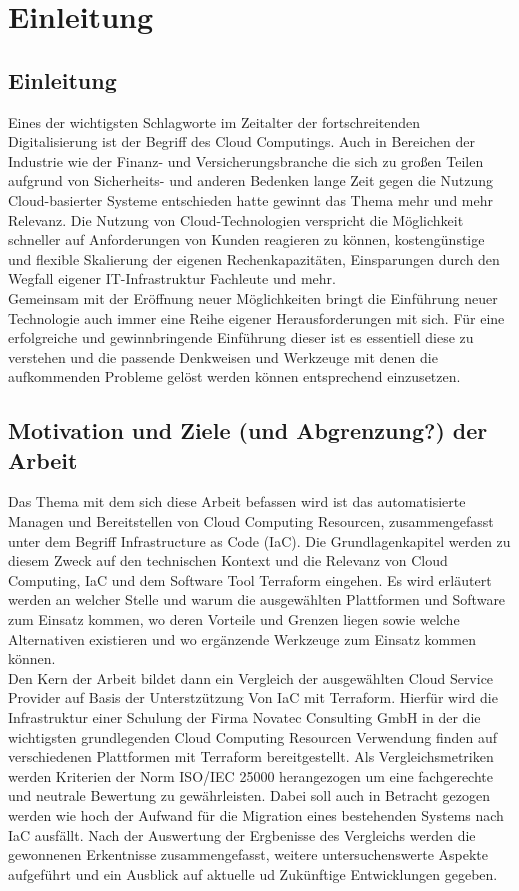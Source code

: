 \chapter{Einleitung}
\label{sec:einl}

\section{Einleitung}
Eines der wichtigsten Schlagworte im Zeitalter der fortschreitenden
Digitalisierung ist der Begriff des Cloud Computings. Auch in Bereichen
der Industrie wie der Finanz-
und Versicherungsbranche die sich zu großen Teilen aufgrund von
Sicherheits- und anderen Bedenken lange Zeit gegen die Nutzung
Cloud-basierter Systeme entschieden hatte gewinnt das Thema mehr und mehr
Relevanz. Die Nutzung von Cloud-Technologien verspricht die Möglichkeit
schneller auf Anforderungen von Kunden reagieren zu können,
kostengünstige und flexible Skalierung der eigenen Rechenkapazitäten,
Einsparungen durch den Wegfall eigener IT-Infrastruktur Fachleute und mehr.\\
Gemeinsam mit der Eröffnung neuer Möglichkeiten bringt die Einführung neuer
Technologie auch immer eine Reihe eigener Herausforderungen
mit sich. Für eine erfolgreiche und gewinnbringende Einführung dieser ist
es essentiell diese zu verstehen und die passende Denkweisen und Werkzeuge
mit denen die aufkommenden Probleme gelöst werden können entsprechend
einzusetzen.

\section{Motivation und Ziele (und Abgrenzung?) der Arbeit}
Das Thema mit dem sich diese Arbeit befassen wird ist das automatisierte
Managen und Bereitstellen von Cloud Computing Resourcen,
zusammengefasst unter dem Begriff Infrastructure as Code (IaC). Die Grundlagenkapitel werden zu diesem Zweck auf
den technischen Kontext und die Relevanz von Cloud Computing, IaC und
dem Software Tool Terraform eingehen.
Es wird erläutert werden an welcher Stelle und warum
die ausgewählten Plattformen und Software zum Einsatz kommen, wo deren
Vorteile und Grenzen liegen sowie welche Alternativen existieren und
wo ergänzende Werkzeuge zum Einsatz kommen können.\\
Den Kern der Arbeit bildet dann ein Vergleich der ausgewählten Cloud
Service Provider auf Basis der Unterstzützung Von IaC mit Terraform.
Hierfür wird die Infrastruktur einer Schulung der Firma Novatec
Consulting GmbH
in der die wichtigsten grundlegenden Cloud Computing Resourcen Verwendung
finden auf verschiedenen Plattformen mit Terraform bereitgestellt.
Als Vergleichsmetriken werden Kriterien der Norm ISO/IEC 25000
herangezogen um eine fachgerechte und neutrale Bewertung zu gewährleisten.
Dabei soll auch in Betracht gezogen werden wie hoch der Aufwand für die
Migration eines bestehenden Systems nach IaC ausfällt.
Nach der Auswertung der Ergbenisse des Vergleichs werden die gewonnenen
Erkentnisse zusammengefasst, weitere untersuchenswerte Aspekte aufgeführt
und ein Ausblick auf aktuelle ud Zukünftige Entwicklungen gegeben.
